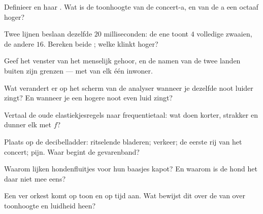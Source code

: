 \begin{exercise}[$\star$]\label{exo:g8:sound-pitch-loudness:1}
Definieer  en haar . Wat is de
toonhoogte van de concert-a, en van de a een octaaf hoger?
\end{exercise}

\begin{exercise}[$\star$]\label{exo:g8:sound-pitch-loudness:2}
Twee lijnen beslaan dezelfde $20$ milliseconden: de ene toont $4$
volledige zwaaien, de andere $16$. Bereken beide ; welke
klinkt hoger?
\end{exercise}

\begin{exercise}[$\star$]\label{exo:g8:sound-pitch-loudness:3}
Geef het venster van het menselijk gehoor, en de namen van de twee
landen buiten zijn grenzen --- met van elk één inwoner.
\end{exercise}

\begin{exercise}[$\star$]\label{exo:g8:sound-pitch-loudness:4}
Wat verandert er op het scherm van de analyser wanneer je dezelfde noot
luider zingt? En wanneer je een hogere noot even luid zingt?
\end{exercise}

\begin{exercise}[$\star$]\label{exo:g8:sound-pitch-loudness:5}
Vertaal de oude elastiekjesregels naar frequentietaal: wat doen korter,
strakker en dunner elk met $f$?
\end{exercise}

\begin{exercise}[$\star$]\label{exo:g8:sound-pitch-loudness:6}
Plaats op de decibelladder: ritselende bladeren; verkeer; de eerste rij
van het concert; pijn. Waar begint de gevarenband?
\end{exercise}

\begin{exercise}[$\star$]\label{exo:g8:sound-pitch-loudness:7}
Waarom lijken hondenfluitjes voor hun baasjes kapot? En waarom is de
hond het daar niet mee eens?
\end{exercise}

\begin{exercise}[$\star$]\label{exo:g8:sound-pitch-loudness:8}
Een ver orkest komt op toon en op tijd aan. Wat bewijst dit over de
 van  over toonhoogte en luidheid
heen?
\end{exercise}

